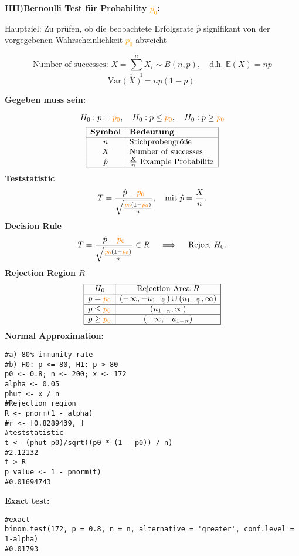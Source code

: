\begin{multicols*}{2}
\begin{center}
    \large{\textbf{IIII)Bernoulli Test für Probability \textcolor{orange}{$p_0$}:}}
\end{center}
\normalsize

Hauptziel: Zu prüfen, ob die beobachtete Erfolgsrate $\hat{p}$ signifikant von der vorgegebenen Wahrscheinlichkeit \textcolor{orange}{$p_0$} abweicht
\begin{center}
$$
\text{Number of successes: } X = \sum_{i=1}^n X_i \sim B(n, p), \quad \text{d.h. } \mathbb{E}(X) = np
$$$$
\text{Var}(X) = np(1-p).
$$
\end{center}
\large{\textbf{Gegeben muss sein:}}

\[
H_0: p = \textcolor{orange}{\textcolor{orange}{p_0}}, \quad H_0: p \leq \textcolor{orange}{p_0}, \quad H_0: p \geq \textcolor{orange}{p_0}
\]
\[
\begin{array}{|c|l|}
\hline
\textbf{Symbol} & \textbf{Bedeutung} \\
\hline
n& \text{Stichprobengröße} \\
X & \text{Number of successes} \\
\hat{p}& \frac{X}{n} \text{ Example Probabilitz} \\
\hline
\end{array}
\]
\large{\textbf{Teststatistic}}
$$
T = \frac{\hat{p} - \textcolor{orange}{p_0}}{\sqrt{\frac{\textcolor{orange}{p_0}(1-\textcolor{orange}{p_0})}{n}}}, \quad \text{mit } \hat{p} = \frac{X}{n}.
$$
\large{\textbf{Decision Rule}}
$$
T = \frac{\hat{p} - \textcolor{orange}{p_0}}{\sqrt{\frac{\textcolor{orange}{p_0}(1-\textcolor{orange}{p_0})}{n}}} \in R \quad \implies \quad \text{Reject } H_0.
$$
\large{\textbf{Rejection Region $R$}}
\[
\begin{array}{|c|c|}
\hline
H_0 & \text{Rejection Area } R \\ \hline
p = \textcolor{orange}{p_0} & (-\infty, -u_{1-\frac{\alpha}{2}}) \cup (u_{1-\frac{\alpha}{2}}, \infty) \\ \hline
p \leq \textcolor{orange}{p_0} & (u_{1-\alpha}, \infty) \\ \hline
p \geq \textcolor{orange}{p_0} & (-\infty, -u_{1-\alpha}) \\ \hline
\end{array}
\]
\large{\textbf{Normal Approximation:}}
\begin{lstlisting}
#a) 80% immunity rate
#b) H0: p <= 80, H1: p > 80
p0 <- 0.8; n <- 200; x <- 172
alpha <- 0.05
phut <- x / n
#Rejection region
R <- pnorm(1 - alpha)
#r <- [0.8289439, ]
#teststatistic
t <- (phut-p0)/sqrt((p0 * (1 - p0)) / n)
#2.12132
t > R
p_value <- 1 - pnorm(t)
#0.01694743
\end{lstlisting}
\large{\textbf{Exact test:}}
\begin{lstlisting}
#exact
binom.test(172, p = 0.8, n = n, alternative = 'greater', conf.level = 1-alpha)
#0.01793
\end{lstlisting}


\end{multicols*}





